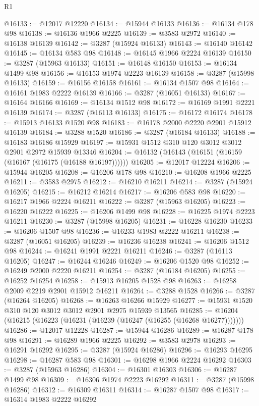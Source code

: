 \begin{lexlean}{R1}
\begin{coremodule}
@16133 := @12017 @12220
@16134 := @15944 @16133
@16136 := @16134 @178 @98
@16138 := @16136 @1966 @2225
@16139 := @3583 @2972
@16140 := @16138 @16139
@16142 := @3287 (@15924 @16133)
@16143 := @16140 @16142
@16145 := @16134 @583 @98
@16148 := @16145 @1966 @2224 @16139
@16150 := @3287 (@15963 @16133)
@16151 := @16148 @16150
@16153 := @16134 @1499 @98
@16156 := @16153 @1974 @2223 @16139
@16158 := @3287 (@15998 @16133)
@16159 := @16156 @16158
@16161 := @16134 @1507 @98
@16164 := @16161 @1983 @2222 @16139
@16166 := @3287 (@16051 @16133)
@16167 := @16164 @16166
@16169 := @16134 @1512 @98
@16172 := @16169 @1991 @2221 @16139
@16174 := @3287 (@16113 @16133)
@16175 := @16172 @16174
@16178 := @15913 @16133 @1520 @98
@16183 := @16178 @2000 @2220 @2901 @15912 @16139
@16184 := @3288 @1520
@16186 := @3287 (@16184 @16133)
@16188 := @16183 @16186 @15929
@16197 := @15931 @1512 @310 @120 @3012 @3012 @2901 @2972 @15939 @13346
@16204 := @16132 (@16143 (@16151 (@16159 (@16167 (@16175 (@16188 @16197))))))
@16205 := @12017 @12224
@16206 := @15944 @16205
@16208 := @16206 @178 @98
@16210 := @16208 @1966 @2225
@16211 := @3583 @2975
@16212 := @16210 @16211
@16214 := @3287 (@15924 @16205)
@16215 := @16212 @16214
@16217 := @16206 @583 @98
@16220 := @16217 @1966 @2224 @16211
@16222 := @3287 (@15963 @16205)
@16223 := @16220 @16222
@16225 := @16206 @1499 @98
@16228 := @16225 @1974 @2223 @16211
@16230 := @3287 (@15998 @16205)
@16231 := @16228 @16230
@16233 := @16206 @1507 @98
@16236 := @16233 @1983 @2222 @16211
@16238 := @3287 (@16051 @16205)
@16239 := @16236 @16238
@16241 := @16206 @1512 @98
@16244 := @16241 @1991 @2221 @16211
@16246 := @3287 (@16113 @16205)
@16247 := @16244 @16246
@16249 := @16206 @1520 @98
@16252 := @16249 @2000 @2220 @16211
@16254 := @3287 (@16184 @16205)
@16255 := @16252 @16254
@16258 := @15913 @16205 @1528 @98
@16263 := @16258 @2009 @2219 @2901 @15912 @16211
@16264 := @3288 @1528
@16266 := @3287 (@16264 @16205)
@16268 := @16263 @16266 @15929
@16277 := @15931 @1520 @310 @120 @3012 @3012 @2901 @2975 @15939 @13565
@16285 := @16204 (@16215 (@16223 (@16231 (@16239 (@16247 (@16255 (@16268 @16277)))))))
@16286 := @12017 @12228
@16287 := @15944 @16286
@16289 := @16287 @178 @98
@16291 := @16289 @1966 @2225
@16292 := @3583 @2978
@16293 := @16291 @16292
@16295 := @3287 (@15924 @16286)
@16296 := @16293 @16295
@16298 := @16287 @583 @98
@16301 := @16298 @1966 @2224 @16292
@16303 := @3287 (@15963 @16286)
@16304 := @16301 @16303
@16306 := @16287 @1499 @98
@16309 := @16306 @1974 @2223 @16292
@16311 := @3287 (@15998 @16286)
@16312 := @16309 @16311
@16314 := @16287 @1507 @98
@16317 := @16314 @1983 @2222 @16292

\end{coremodule}
\end{lexlean}
